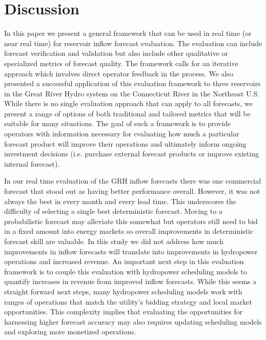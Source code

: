 \documentclass[MLA,Times1COL, hidelinks, doublespace]{WileyNJDv5} %
\begin{document}


\section{Discussion}

In this paper we present a general framework that can be used in real time (or near real time) for reservoir inflow forecast evaluation. The  evaluation can include forecast verification and validation but also include other qualitative or specialized metrics of forecast quality. The framework calls for an iterative approach which involves direct operator feedback in the process. We also presented a successful application of this evaluation framework to three reservoirs in the Great River Hydro system on the Connecticut River in the Northeast U.S. While there is no single evaluation approach that can apply to all forecasts, we present a range of options of both traditional and tailored metrics that will be suitable for many situations. The goal of such a framework is to provide operators with information necessary for evaluating how much a particular forecast product will improve their operations and ultimately inform ongoing investment decisions (i.e. purchase external forecast products or improve existing internal forecast). 

In our real time evaluation of the GRH inflow forecasts there was one commercial forecast that stood out as having better performance overall. However, it was not always the best in every month and every lead time. This underscores the difficulty of selecting a single best deterministic forecast. Moving to a probabilistic forecast may alleviate this somewhat but operators still need to bid in a fixed amount into energy markets so overall improvements in deterministic forecast skill are valuable. In this study we did not address how much improvements in inflow forecasts will translate into improvements in hydropower operations and increased revenue. An important next step in this evaluation framework is to couple this evaluation with hydropower scheduling models to quantify increases in revenue from improved inflow forecasts. While this seems a straight forward next steps, many hydropower scheduling models work with ranges of operations that match the utility's bidding strategy and local market opportunities. This complexity implies that evaluating the opportunities for harnessing higher forecast accuracy may also requires updating scheduling models and exploring more monetized operations. 
\end{document}
